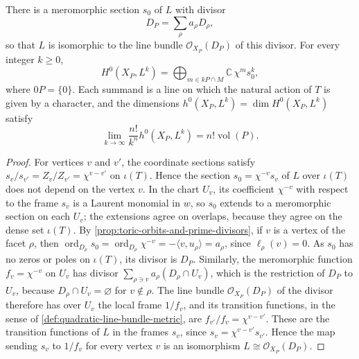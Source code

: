 \begin{theorem}\label{thm:toric-character-section-basis}
There is a meromorphic section $s_0$ of $L$ with divisor
\[
 D_P=\sum_\rho a_\rho D_\rho,
\]
so that $L$ is isomorphic to the line bundle $\mathcal O_{X_P}(D_P)$ of this divisor. For every integer $k\geq0$,
\[
 H^0(X_P,L^k)=\bigoplus_{m\in kP\cap M}\mathbb C\,\chi^m s_0^k,
\]
where $0P=\{0\}$. Each summand is a line on which the natural action of $T$ is given by a character, and the dimensions $h^0(X_P,L^k)=\dim H^0(X_P,L^k)$ satisfy
\[
 \lim_{k\to\infty}\frac{n!}{k^n}h^0(X_P,L^k)=n!\operatorname{vol}(P).
\]
\end{theorem}
\begin{proof}
For vertices $v$ and $v'$, the coordinate sections satisfy $s_v/s_{v'}=Z_v/Z_{v'}=\chi^{v-v'}$ on $\iota(T)$. Hence the section $s_0=\chi^{-v}s_v$ of $L$ over $\iota(T)$ does not depend on the vertex $v$. In the chart $U_v$, its coefficient $\chi^{-v}$ with respect to the frame $s_v$ is a Laurent monomial in $w$, so $s_0$ extends to a meromorphic section on each $U_v$; the extensions agree on overlaps, because they agree on the dense set $\iota(T)$. By \cref{prop:toric-orbits-and-prime-divisors}, if $v$ is a vertex of the facet $\rho$, then $\operatorname{ord}_{D_\rho}s_0=\operatorname{ord}_{D_\rho}\chi^{-v}=-\langle v,u_\rho\rangle=a_\rho$, since $\ell_\rho(v)=0$. As $s_0$ has no zeros or poles on $\iota(T)$, its divisor is $D_P$. Similarly, the meromorphic function $f_v=\chi^{-v}$ on $U_v$ has divisor $\sum_{\rho\ni v}a_\rho(D_\rho\cap U_v)$, which is the restriction of $D_P$ to $U_v$, because $D_\rho\cap U_v=\varnothing$ for $v\notin\rho$. The line bundle $\mathcal O_{X_P}(D_P)$ of the divisor therefore has over $U_v$ the local frame $1/f_v$, and its transition functions, in the sense of \cref{def:quadratic-line-bundle-metric}, are $f_{v'}/f_v=\chi^{v-v'}$. These are the transition functions of $L$ in the frames $s_v$, since $s_v=\chi^{v-v'}s_{v'}$. Hence the map sending $s_v$ to $1/f_v$ for every vertex $v$ is an isomorphism $L\cong\mathcal O_{X_P}(D_P)$.


\end{proof}
